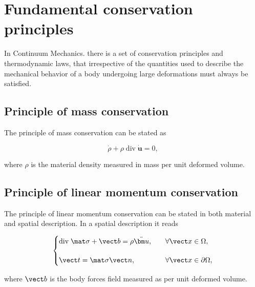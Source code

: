\section{Fundamental conservation principles} \label{sec:fundamental_conservation_princ}

In Continuum Mechanics. there is a set of conservation principles and thermodynamic laws, that irrespective of the quantities used to describe the mechanical behavior of a body undergoing large deformations must always be satisfied.

\subsection{Principle of mass conservation}

The principle of mass conservation can be stated as
\begin{highlight}
    \begin{equation}
        \dot \rho + \rho\; \text{div}\; \dot{\bm u}=0,
    \end{equation}
\end{highlight}
    where $\rho$ is the material density measured in mass per unit deformed volume.

\subsection{Principle of linear momentum conservation}

The principle of linear momentum conservation can be stated in both material and spatial description.
In a spatial description it reads
\begin{highlight}
    \begin{equation}
        \begin{cases}
            \text{div}\;\mat \sigma + \vect b = \rho \ddot{\bm u},&\quad \forall\vect x\in \Omega,\\[12pt]
            \vect t = \mat \sigma \vect n,&\quad \forall\vect x\in\partial\Omega,
        \end{cases} \label{eq:material_equilibrium}
    \end{equation}
\end{highlight}
where $\vect b$ is the body forces field measured as per unit deformed volume.

